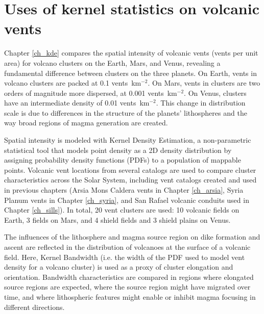 \section{Uses of kernel statistics on volcanic vents}
Chapter \ref{ch_kde} compares the spatial intensity of volcanic vents (vents per unit area) for volcano clusters on the Earth, Mars, and Venus, revealing a fundamental difference between clusters on the three planets. On Earth, vents in volcano clusters are packed at 0.1 vents~km$^{-2}$. On Mars, vents in clusters are two orders of magnitude more dispersed, at 0.001 vents~km$^{-2}$. On Venus, clusters have an intermediate density of 0.01 vents~km$^{-2}$. This change in distribution scale is due to differences in the structure of the planets' lithospheres and the way broad regions of magma generation are created.

Spatial intensity is modeled with Kernel Density Estimation, a non-parametric statistical tool that models point density as a 2D density distribution by assigning probability density functions (PDFs) to a population of mappable points. Volcanic vent locations from several catalogs are used to compare cluster characteristics across the Solar System, including vent catalogs created and used in previous chapters (Arsia Mons Caldera vents in Chapter \ref{ch_arsia}, Syria Planum vents in Chapter \ref{ch_syria}, and San Rafael volcanic conduits used in Chapter \ref{ch_sills}). In total, 20 vent clusters are used: 10 volcanic fields on Earth, 3 fields on Mars, and 4 shield fields and 3 shield plains on Venus. 

The influences of the lithosphere and magma source region on dike formation and ascent are reflected in the distribution of volcanoes at the surface of a volcanic field. Here, Kernel Bandwidth (i.e. the width of the PDF used to model vent density for a volcano cluster) is used as a proxy of cluster elongation and orientation. Bandwidth characteristics are compared in regions where elongated source regions are expected, where the source region might have migrated over time, and where lithospheric features might enable or inhibit magma focusing in different directions.



% 
